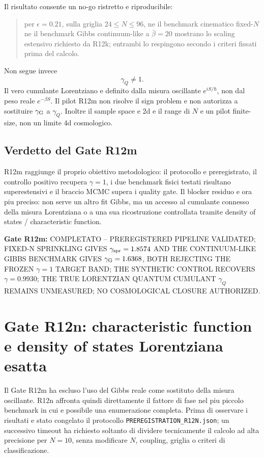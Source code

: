 \documentclass[11pt,a4paper]{article}
\newcommand{\status}[1]{\textsf{#1}}
\begin{document}
Il risultato consente un no-go ristretto e riproducibile:
\begin{quote}
per $\epsilon=0.21$, sulla griglia $24\le N\le96$, ne il benchmark cinematico fixed-$N$ ne il benchmark Gibbs continuum-like a $\bar\beta=20$ mostrano lo scaling estensivo richiesto da R12k; entrambi lo respingono secondo i criteri fissati prima del calcolo.
\end{quote}
Non segue invece
\begin{equation}
\gamma_Q\ne1.
\end{equation}
Il vero cumulante Lorentziano e definito dalla misura oscillante $e^{iS/\hbar}$, non dal peso reale $e^{-\beta S}$. Il pilot R12m non risolve il sign problem e non autorizza a sostituire $\gamma_{\rm G}$ a $\gamma_Q$. Inoltre il sample space e 2d e il range di $N$ e un pilot finite-size, non un limite 4d cosmologico.

\subsection{Verdetto del Gate R12m}

R12m raggiunge il proprio obiettivo metodologico: il protocollo e preregistrato, il controllo positivo recupera $\gamma=1$, i due benchmark fisici testati risultano superestensivi e il braccio MCMC supera i quality gate. Il blocker residuo e ora piu preciso: non serve un altro fit Gibbs, ma un accesso al cumulante connesso della misura Lorentziana o a una sua ricostruzione controllata tramite density of states / characteristic function.

\textbf{Gate R12m:}
\status{COMPLETATO -- PREREGISTERED PIPELINE VALIDATED; FIXED-N SPRINKLING GIVES $\gamma_{\rm spr}=1.8574$ AND THE CONTINUUM-LIKE GIBBS BENCHMARK GIVES $\gamma_{\rm G}=1.6368$, BOTH REJECTING THE FROZEN $\gamma=1$ TARGET BAND; THE SYNTHETIC CONTROL RECOVERS $\gamma=0.9930$; THE TRUE LORENTZIAN QUANTUM CUMULANT $\gamma_Q$ REMAINS UNMEASURED; NO COSMOLOGICAL CLOSURE AUTHORIZED.}


\section{Gate R12n: characteristic function e density of states Lorentziana esatta}

Il Gate R12m ha escluso l'uso del Gibbs reale come sostituto della misura oscillante. R12n affronta quindi direttamente il fattore di fase nel piu piccolo benchmark in cui e possibile una enumerazione completa. Prima di osservare i risultati e stato congelato il protocollo \texttt{PREREGISTRATION\_R12N.json}; un successivo timeout ha richiesto soltanto di dividere tecnicamente il calcolo ad alta precisione per $N=10$, senza modificare $N$, coupling, griglia o criteri di classificazione.
\end{document}
